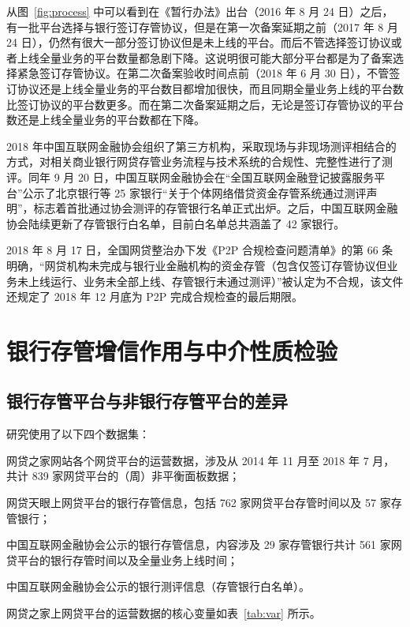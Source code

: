 \documentclass[lang=cn,11pt]{elegantpaper}
\begin{document}
从图~\ref{fig:process} 中可以看到在《暂行办法》出台（2016 年 8 月 24 日）之后，有一批平台选择与银行签订存管协议，但是在第一次备案延期之前（2017 年 8 月 24 日），仍然有很大一部分签订协议但是未上线的平台。而后不管选择签订协议或者上线全量业务的平台数量都急剧下降。这说明很可能大部分平台都是为了备案选择紧急签订存管协议。在第二次备案验收时间点前（2018 年 6 月 30 日），不管签订协议还是上线全量业务的平台数目都增加很快，而且同期全量业务上线的平台数比签订协议的平台数更多。而在第二次备案延期之后，无论是签订存管协议的平台数还是上线全量业务的平台数都在下降。

2018 年中国互联网金融协会组织了第三方机构，采取现场与非现场测评相结合的方式，对相关商业银行网贷存管业务流程与技术系统的合规性、完整性进行了测评。同年 9 月 20 日，中国互联网金融协会在“全国互联网金融登记披露服务平台”公示了北京银行等 25 家银行“关于个体网络借贷资金存管系统通过测评声明”，标志着首批通过协会测评的存管银行名单正式出炉。之后，中国互联网金融协会陆续更新了存管银行白名单，目前白名单总共涵盖了 42 家银行。

2018 年 8 月 17 日，全国网贷整治办下发《P2P 合规检查问题清单》的第 66 条明确，“网贷机构未完成与银行业金融机构的资金存管（包含仅签订存管协议但业务未上线运行、业务未全部上线、存管银行未通过测评）”被认定为不合规，该文件还规定了 2018 年 12 月底为 P2P 完成合规检查的最后期限。

\section{银行存管增信作用与中介性质检验}

\subsection{银行存管平台与非银行存管平台的差异}

研究使用了以下四个数据集：
\begin{enumerate*}[label=（\arabic*）]
    \item 网贷之家网站各个网贷平台的运营数据，涉及从 2014 年 11 月至 2018 年 7 月，共计 839 家网贷平台的（周）非平衡面板数据；
    \item 网贷天眼上网贷平台的银行存管信息，包括 762 家网贷平台存管时间以及 57 家存管银行；
    \item 中国互联网金融协会公示的银行存管信息，内容涉及 29 家存管银行共计 561 家网贷平台的银行存管时间以及全量业务上线时间；
    \item 中国互联网金融协会公示的银行测评信息（存管银行白名单）。
\end{enumerate*}
网贷之家上网贷平台的运营数据的核心变量如表~\ref{tab:var} 所示。
\end{document}
